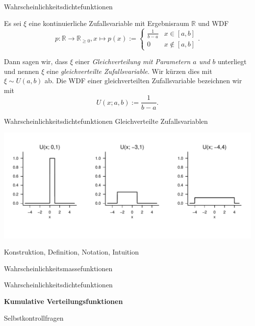\documentclass[
  8pt,
  ignorenonframetext,
]{beamer}
\begin{document}
\begin{frame}{Wahrscheinlichkeitsdichtefunktionen}
\protect\hypertarget{wahrscheinlichkeitsdichtefunktionen-7}{}
\small
\begin{definition}
\justifying
Es sei $\xi$ eine kontinuierliche Zufallsvariable mit Ergebnisraum $\mathbb{R}$ und WDF
\begin{equation}
p : \mathbb{R} \to \mathbb{R}_{\ge 0}, x\mapsto p(x) :=
\begin{cases}
\frac{1}{b - a} & x \in [a,b] \\
0               & x \notin [a,b]
\end{cases}.
\end{equation}

Dann sagen wir, dass $\xi$ einer \textit{Gleichverteilung mit Parametern $a$ und $b$}
unterliegt und nennen $\xi$ eine \textit{gleichverteilte Zufallsvariable}. Wir
kürzen dies mit $\xi \sim U(a,b)$ ab. Die WDF einer gleichverteilten Zufallsvariable
bezeichnen wir mit
\begin{equation}
U(x;a,b) := \frac{1}{b - a}.
\end{equation}
\end{definition}
\end{frame}

\begin{frame}{Wahrscheinlichkeitsdichtefunktionen}
\protect\hypertarget{wahrscheinlichkeitsdichtefunktionen-8}{}
Gleichverteilte Zufallsvariablen \vspace{1cm}

\begin{center}\includegraphics[width=1\linewidth]{4_Abbildungen/wtfi_4_gleichverteilung_wdf} \end{center}
\end{frame}

\begin{frame}{}
\protect\hypertarget{section-8}{}
\large
{}
\vfill

Konstruktion, Definition, Notation, Intuition

Wahrscheinlichkeitsmassefunktionen

Wahrscheinlichkeitsdichtefunktionen

\textbf{Kumulative Verteilungsfunktionen}

Selbstkontrollfragen \vfill
\end{frame}
\end{document}

